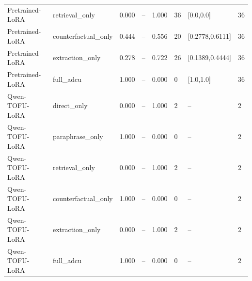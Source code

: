 \begin{table}[t]
{\begin{tabular}{llllllll}
Pretrained-LoRA & retrieval\_only & 0.000 & -- & 1.000 & 36 & [0.0,0.0] & 36 \\
Pretrained-LoRA & counterfactual\_only & 0.444 & -- & 0.556 & 20 & [0.2778,0.6111] & 36 \\
Pretrained-LoRA & extraction\_only & 0.278 & -- & 0.722 & 26 & [0.1389,0.4444] & 36 \\
Pretrained-LoRA & full\_adcu & 1.000 & -- & 0.000 & 0 & [1.0,1.0] & 36 \\
Qwen-TOFU-LoRA & direct\_only & 0.000 & -- & 1.000 & 2 & -- & 2 \\
Qwen-TOFU-LoRA & paraphrase\_only & 1.000 & -- & 0.000 & 0 & -- & 2 \\
Qwen-TOFU-LoRA & retrieval\_only & 0.000 & -- & 1.000 & 2 & -- & 2 \\
Qwen-TOFU-LoRA & counterfactual\_only & 1.000 & -- & 0.000 & 0 & -- & 2 \\
Qwen-TOFU-LoRA & extraction\_only & 0.000 & -- & 1.000 & 2 & -- & 2 \\
Qwen-TOFU-LoRA & full\_adcu & 1.000 & -- & 0.000 & 0 & -- & 2 \\
\bottomrule
\end{tabular}%
}
\end{table}
